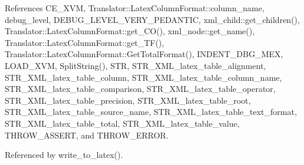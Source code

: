 References C\+E\+\_\+\+X\+VM, Translator\+::\+Latex\+Column\+Format\+::column\+\_\+name, debug\+\_\+level, D\+E\+B\+U\+G\+\_\+\+L\+E\+V\+E\+L\+\_\+\+V\+E\+R\+Y\+\_\+\+P\+E\+D\+A\+N\+T\+IC, xml\+\_\+child\+::get\+\_\+children(), Translator\+::\+Latex\+Column\+Format\+::get\+\_\+\+C\+O(), xml\+\_\+node\+::get\+\_\+name(), Translator\+::\+Latex\+Column\+Format\+::get\+\_\+\+T\+F(), Translator\+::\+Latex\+Column\+Format\+::\+Get\+Total\+Format(), I\+N\+D\+E\+N\+T\+\_\+\+D\+B\+G\+\_\+\+M\+EX, L\+O\+A\+D\+\_\+\+X\+VM, Split\+String(), S\+TR, S\+T\+R\+\_\+\+X\+M\+L\+\_\+latex\+\_\+table\+\_\+alignment, S\+T\+R\+\_\+\+X\+M\+L\+\_\+latex\+\_\+table\+\_\+column, S\+T\+R\+\_\+\+X\+M\+L\+\_\+latex\+\_\+table\+\_\+column\+\_\+name, S\+T\+R\+\_\+\+X\+M\+L\+\_\+latex\+\_\+table\+\_\+comparison, S\+T\+R\+\_\+\+X\+M\+L\+\_\+latex\+\_\+table\+\_\+operator, S\+T\+R\+\_\+\+X\+M\+L\+\_\+latex\+\_\+table\+\_\+precision, S\+T\+R\+\_\+\+X\+M\+L\+\_\+latex\+\_\+table\+\_\+root, S\+T\+R\+\_\+\+X\+M\+L\+\_\+latex\+\_\+table\+\_\+source\+\_\+name, S\+T\+R\+\_\+\+X\+M\+L\+\_\+latex\+\_\+table\+\_\+text\+\_\+format, S\+T\+R\+\_\+\+X\+M\+L\+\_\+latex\+\_\+table\+\_\+total, S\+T\+R\+\_\+\+X\+M\+L\+\_\+latex\+\_\+table\+\_\+value, T\+H\+R\+O\+W\+\_\+\+A\+S\+S\+E\+RT, and T\+H\+R\+O\+W\+\_\+\+E\+R\+R\+OR.



Referenced by write\+\_\+to\+\_\+latex().


